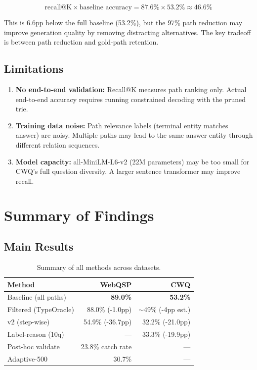 \documentclass[11pt,twoside]{article}
\begin{document}
\[
  \text{recall@K} \times \text{baseline accuracy} =
  87.6\% \times 53.2\% \approx 46.6\%
\]

This is 6.6pp below the full baseline (53.2\%), but the 97\% path reduction may
improve generation quality by removing distracting alternatives. The key
tradeoff is between path reduction and gold-path retention.

\subsection{Limitations}

\begin{enumerate}
  \item \textbf{No end-to-end validation:} Recall@K measures path ranking only.
        Actual end-to-end accuracy requires running constrained decoding with
        the pruned trie.
  \item \textbf{Training data noise:} Path relevance labels (terminal entity
        matches answer) are noisy. Multiple paths may lead to the same answer
        entity through different relation sequences.
  \item \textbf{Model capacity:} all-MiniLM-L6-v2 (22M parameters) may be too
        small for CWQ's full question diversity. A larger sentence transformer
        may improve recall.
\end{enumerate}

\section{Summary of Findings}
\label{sec:summary}

\subsection{Main Results}

\begin{table}[H]
  \centering
  \caption{Summary of all methods across datasets.}
  \label{tab:summary}
  \begin{tabular}{lrr}
    \toprule
    \textbf{Method} & \textbf{WebQSP} & \textbf{CWQ} \\
    \midrule
    Baseline (all paths) & \textbf{89.0\%} & \textbf{53.2\%} \\
    Filtered (TypeOracle) & 88.0\% (-1.0pp) & \(\sim\)49\% (-4pp est.) \\
    v2 (step-wise) & 54.9\% (-36.7pp) & 32.2\% (-21.0pp) \\
    Label-reason (10q) & --- & 33.3\% (-19.9pp) \\
    Post-hoc validate & 23.8\% catch rate & --- \\
    Adaptive-500 & 30.7\% & --- \\
    \bottomrule
  \end{tabular}
\end{table}
\end{document}
